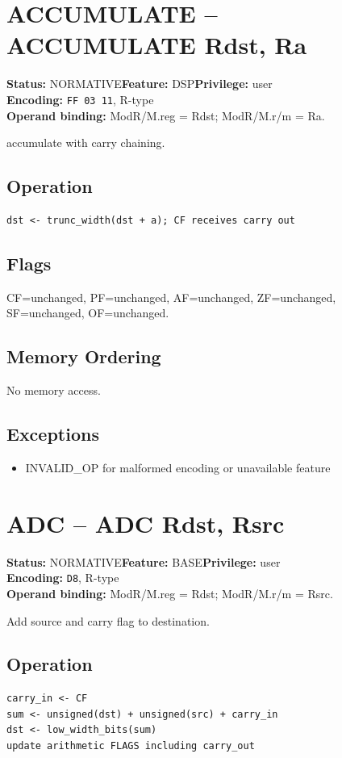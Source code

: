 \documentclass[10pt]{article}
\begin{document}
\section{ACCUMULATE -- ACCUMULATE Rdst, Ra}
\textbf{Status:} NORMATIVE\quad \textbf{Feature:} DSP\quad \textbf{Privilege:} user\\
\textbf{Encoding:} \texttt{FF 03 11}, R-type\\
\textbf{Operand binding:} ModR/M.reg = Rdst; ModR/M.r/m = Ra.

accumulate with carry chaining.

\subsection*{Operation}
\begin{lstlisting}
dst <- trunc_width(dst + a); CF receives carry out
\end{lstlisting}
\subsection*{Flags}
CF=unchanged, PF=unchanged, AF=unchanged, ZF=unchanged, SF=unchanged, OF=unchanged.
\subsection*{Memory Ordering}
No memory access.
\subsection*{Exceptions}
\begin{itemize}
\item INVALID\_OP for malformed encoding or unavailable feature
\end{itemize}
\clearpage

\section{ADC -- ADC Rdst, Rsrc}
\textbf{Status:} NORMATIVE\quad \textbf{Feature:} BASE\quad \textbf{Privilege:} user\\
\textbf{Encoding:} \texttt{D8}, R-type\\
\textbf{Operand binding:} ModR/M.reg = Rdst; ModR/M.r/m = Rsrc.

Add source and carry flag to destination.

\subsection*{Operation}
\begin{lstlisting}
carry_in <- CF
sum <- unsigned(dst) + unsigned(src) + carry_in
dst <- low_width_bits(sum)
update arithmetic FLAGS including carry_out
\end{lstlisting}
\end{document}
